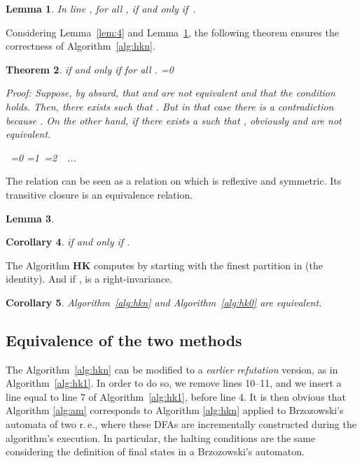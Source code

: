 \documentclass[copyright]{eptcs}
\makeatletter
\newtheorem{theorem}{Theorem}
\newtheorem{lemma}[theorem]{Lemma}
\newtheorem{corollary}[theorem]{Corollary}
\newcounter{d@proof}\let\thed@proof\relax\setcounter{d@proof}{0}
\newcommand*{\qed}{}
\newenvironment{proof}{\ifnum \value{d@proof}=0{\setcounter{claim}{0}}\else\fi
  \stepcounter{d@proof}\par\noindent
  {\rmfamily\itshape\mdseries Proof\/}:\hspace{\labelsep}\ignorespaces}{\addtocounter{d@proof}{-1}\mbox{}\nolinebreak\hfill~\ifnum \value{d@proof}=0{\qed}\else
    \ifnum \value{d@proof}=1{\qed\nolinebreak\,\nolinebreak\qed}\else
      \ifnum \value{d@proof}=2{\qed\nolinebreak\,\nolinebreak\qed
          \nolinebreak\,\nolinebreak\qed}\else
        {\qed\nolinebreak...\nolinebreak\qed}\fi\fi\fi
  \medbreak
}
\newcommand{\dfas}{DFAs\xspace}
\newcommand{\re}{r.\,e.\xspace}
\newcommand{\hk}{\textbf{HK}\xspace}
\makeatother
\begin{document}
\begin{lemma}
  \label{lem:5}
  In line , for all ,  if and
  only if~.
\end{lemma}

Considering Lemma~\ref{lem:4} and Lemma~\ref{lem:5}, the following
theorem ensures the correctness of Algorithm~\ref{alg:hkn}.

\begin{theorem}
  \label{th:dfa_equiv}
   if and only if for all .
  \begin{proof}
  \emph{
      Suppose, by absurd, that  and  are not equivalent and that
      the condition holds. Then, there exists  such
      that . But in
      that case there is a contradiction because . On the other hand, if there exists a
       such that , obviously 
      and  are not equivalent.}
  \end{proof}
\end{theorem}

The relation  can be seen as a relation on  which
is reflexive and symmetric. Its transitive closure  is an
equivalence relation.

\begin{lemma}\label{lem:rs}
  
\end{lemma}
\begin{corollary}\label{cor:1}
  if and only if .
\end{corollary}
  The Algorithm \hk{} computes  by starting with the finest
  partition in  (the identity). And if ,
   is a right-invariance.
\begin{corollary}\label{cor:hknhk0}
  Algorithm~\ref{alg:hkn} and Algorithm~\ref{alg:hk0} are equivalent.
\end{corollary}

\subsection{Equivalence of the two methods}

The Algorithm~\ref{alg:hkn} can be modified to a \emph{earlier
  refutation} version, as in Algorithm~\ref{alg:hk1}. In order to do
so, we remove lines 10--11, and we insert a line equal to line 7 of
Algorithm~\ref{alg:hk1}, before line 4. It is then obvious that
Algorithm \ref{alg:am} corresponds to Algorithm \ref{alg:hkn} applied
to Brzozowski's automata of two \re, where these \dfas are
incrementally constructed during the algorithm's execution. In
particular, the halting conditions are the same considering the
definition of final states in a Brzozowski's automaton.
\end{document}

